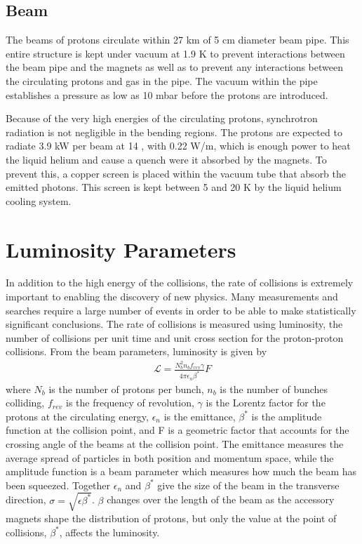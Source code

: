 \subsection{Beam}

The beams of protons circulate within 27 km of 5 cm diameter beam pipe.
This entire structure is kept under vacuum at 1.9 K to prevent interactions between the beam pipe and the magnets as well as to prevent any interactions between the circulating protons and gas in the pipe. 
The vacuum within the pipe establishes a pressure as low as 10 mbar before the protons are introduced.

Because of the very high energies of the circulating protons, synchrotron radiation is not negligible in the bending regions.
The protons are expected to radiate 3.9 kW per beam at 14 \TeV, with 0.22 W/m, which is enough power to heat the liquid helium and cause a quench were it absorbed by the magnets.
To prevent this, a copper screen is placed within the vacuum tube that absorb the emitted photons.
This screen is kept between 5 and 20 K by the liquid helium cooling system.


\section{Luminosity Parameters}

In addition to the high energy of the collisions, the rate of collisions is extremely important to enabling the discovery of new physics.
Many measurements and searches require a large number of events in order to be able to make statistically significant conclusions.
The rate of collisions is measured using luminosity, the number of collisions per unit time and unit cross section for the proton-proton collisions.
From the beam parameters, luminosity is given by 
\begin{align}
\mathcal{L} = \frac{N_b^2 n_b f_{rev} \gamma}{4\pi \epsilon_n \beta^*} F \label{eq:luminosity} 
\end{align}
\noindent where $N_b$ is the number of protons per bunch, $n_b$ is the number of bunches colliding, $f_{rev}$ is the frequency of revolution, $\gamma$ is the Lorentz factor for the protons at the circulating energy, $\epsilon_n$ is the emittance, $\beta^*$ is the amplitude function at the collision point, and F is a geometric factor that accounts for the crossing angle of the beams at the collision point. 
The emittance measures the average spread of particles in both position and momentum space, while the amplitude function is a beam parameter which measures how much the beam has been squeezed. 
Together $\epsilon_n$ and $\beta^*$ give the size of the beam in the transverse direction, $\sigma = \sqrt{\epsilon\beta^*}$. 
$\beta$ changes over the length of the beam as the accessory magnets shape the distribution of protons, but only the value at the point of collisions, $\beta^*$, affects the luminosity.

